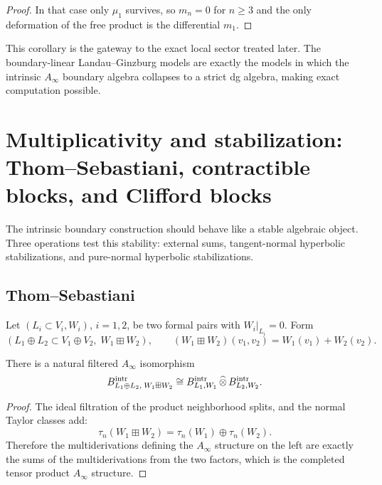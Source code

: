 \begin{proof}
In that case only $\mu_1$ survives, so $m_n=0$ for $n\ge 3$ and the only deformation of the free product is the differential $m_1$.
\end{proof}

\begin{remark}
This corollary is the gateway to the exact local sector treated later. The boundary-linear Landau--Ginzburg models are exactly the models in which the intrinsic $A_\infty$ boundary algebra collapses to a strict dg algebra, making exact computation possible.
\end{remark}


\section{Multiplicativity and stabilization: Thom--Sebastiani, contractible blocks, and Clifford blocks}%

The intrinsic boundary construction should behave like a stable algebraic object. Three operations test this stability: external sums, tangent-normal hyperbolic stabilizations, and pure-normal hyperbolic stabilizations.

\subsection{Thom--Sebastiani}

Let $(L_i\subset V_i,W_i)$, $i=1,2$, be two formal pairs with $W_i|_{L_i}=0$. Form
\[
(L_1\oplus L_2 \subset V_1\oplus V_2,\; W_1\boxplus W_2),
\qquad
(W_1\boxplus W_2)(v_1,v_2)=W_1(v_1)+W_2(v_2).
\]

\begin{theorem}%
There is a natural filtered $A_\infty$ isomorphism
\[
B^{\mathrm{intr}}_{L_1\oplus L_2,\;W_1\boxplus W_2}
\cong
B^{\mathrm{intr}}_{L_1,W_1}\,\widehat{\otimes}\, B^{\mathrm{intr}}_{L_2,W_2}.
\]
\end{theorem}

\begin{proof}
The ideal filtration of the product neighborhood splits, and the normal Taylor classes add:
\[
\tau_n(W_1\boxplus W_2)=\tau_n(W_1)\oplus \tau_n(W_2).
\]
Therefore the multiderivations defining the $A_\infty$ structure on the left are exactly the sums of the multiderivations from the two factors, which is the completed tensor product $A_\infty$ structure.
\end{proof}

